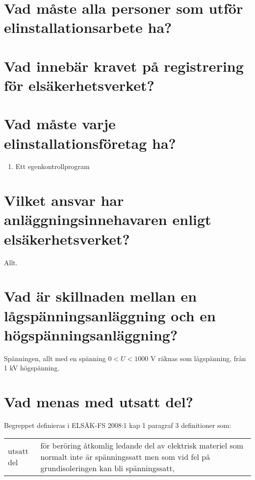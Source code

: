 \documentclass[a4paper,swedish]{article}
\begin{document}
\setcounter{section}{49}
\section{Vad måste alla personer som utför elinstallationsarbete ha?}

\setcounter{section}{51}
\section{Vad innebär kravet på registrering för elsäkerhetsverket?}

\setcounter{section}{53}
\section{Vad måste varje elinstallationsföretag ha?}\label{sec:designated_person}

\begin{enumerate}
\item Ett egenkontrollprogram
\end{enumerate}

\setcounter{section}{55}
\section{Vilket ansvar har anläggningsinnehavaren enligt elsäkerhetsverket?}\label{sec:innehavarens_ansvar}

Allt.

\setcounter{section}{57}
\section{Vad är skillnaden mellan en lågspänningsanläggning och en högspänningsanläggning?}

Spänningen, allt med en spänning $0 < U <1000$ V räknas som lågspänning, från 1 kV högspänning.

\setcounter{section}{59}
\section{Vad menas med utsatt del?}

Begreppet definieras i ELSÄK-FS 2008:1 kap 1 paragraf 3 definitioner som:

\begin{center}
  \begin{tabular}{|l p{10cm}|}
    utsatt del & för beröring åtkomlig ledande del av elektrisk materiel
                 som normalt inte är spänningssatt men som vid fel på
                 grundisoleringen kan bli spänningssatt,
  \end{tabular}
\end{center}
\end{document}
